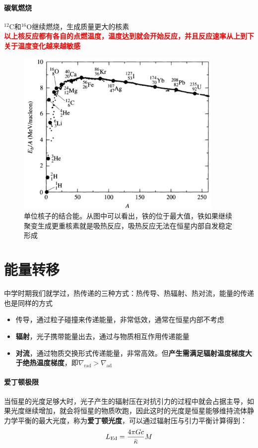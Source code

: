 \documentclass[openany]{ctexbook}
\begin{document}
\paragraph{碳氧燃烧}
$^{12}$C和$^{16}$O继续燃烧，生成质量更大的核素\\
\newline
\textcolor{red}{\bf 以上核反应都有各自的点燃温度，温度达到就会开始反应，并且反应速率从上到下关于温度变化越来越敏感}

\begin{figure}[hbt]
  \centering
  \includegraphics[width=10cm]{chapters/10/bindingenergy}
  \caption{单位核子的结合能。从图中可以看出，铁的位于最大值，铁如果继续聚变生成更重核素就是吸热反应，吸热反应无法在恒星内部自发稳定形成}
  \label{}
\end{figure}



\section{能量转移}
中学时期我们就学过，热传递的三种方式：热传导、热辐射、热对流，能量的传递也是同样的方式
\begin{itemize}
  \item 传导，通过粒子碰撞来传递能量，非常低效，通常在恒星内部不考虑
  \item \textbf{辐射}，光子携带能量出去，通过与物质相互作用传递能量
  \item \textbf{对流}，通过物质交换形式传递能量，非常高效。但\textbf{产生需满足辐射温度梯度大于绝热温度梯度}，即$\nabla_\mathrm{rad}>\nabla_\mathrm{ad}$
\end{itemize}

\paragraph{爱丁顿极限}
当恒星的光度足够大时，光子产生的辐射压在对抗引力的过程中就会占据主导，如果光度继续增加，就会将恒星的物质吹跑，因此这时的光度是恒星能够维持流体静力学平衡的最大光度，称为\textbf{爱丁顿光度}，可以通过辐射压与引力平衡计算得到：
\begin{equation}
  L_\mathrm{Ed}={4\pi Gc \over \bar\kappa}M
\end{equation}
\end{document}
